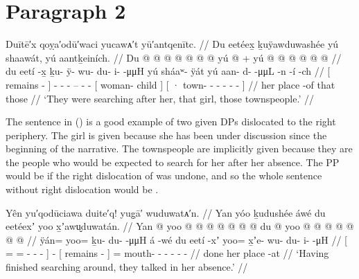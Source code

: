 \section{Paragraph 2}

\ex\label{ex:89-19-searching-for-girl}%
%
\begingl
	\glpreamble	Duītē′x qoỵa′odū′waci yucawᴀ′t yū′antqenītc. //
	\glpreamble	Du eetéex̱ ḵuÿawduwashée yú shaawát, yú aantḵeiních. //
	\gla	{} Du  @ {} {}
		 @ {} @ {} @ {} @ {} @ {} @ {}
		{} yú  @ {} {} +
		{} yú  @ {} @ {} @ {} @ {} @ {} @ {} {} //
	\glb	{} du eetí -x̱ {}
		ḵu- ÿ- wu- du- i-  -μμH
		{} yú sháaʷ- ÿát {}
		{} yú aan- d-  -μμL -n -í -ch {} //
	\glc	{}[  remains - {}]
		- - - -- -  -
		{}[  woman- child {}]
		{}[ · town- -  - - - - {}] //
	\gld	{} her place -of {}
		 {} {} {} {} {} {}
		{} that  {} {}
		{} those  {} {} {} {} {} {} {} //
	\glft	‘They were searching after her, that girl, those townspeople.’
		//
\endgl
\xe

The sentence in (\lastx) is a good example of two given DPs dislocated to the right periphery.
The girl  is given because she has been under discussion since the beginning of the narrative.
The townspeople  are implicitly given because they are the people who would be expected to search for her after her absence.
The PP  would be  if the right dislocation of  was undone, and so the whole sentence without right dislocation would be .

\ex\label{ex:89-20-done-searching-talked}%
%
\begingl
	\glpreamble	Yên yu′qodūciawa duite′q! yug̣ā′ wuduwatᴀ′n. //
	\glpreamble	Yan yóo ḵudushée áwé du eetéexʼ yoo x̱ʼawu̬duwatán. //
	\gla	{} Yan @ yoo @  @ {} @ {} @ {} @ {} @ {} {}
		 @ {}
		{} du  @ {} {}
		yoo @  @ {} @ {} @ {} @ {} @ {} @ {} //
	\glb	{} ÿán= yoo= ḵu- {} du-  -μμH {} {}
		á -wé
		{} du eetí -xʼ {}
		yoo= x̱ʼe- wu- du- {} i-  -μH //
	\glc	{}[ = = - \· -  - \· {}]
		 -
		{}[  remains - {}]
		= mouth- - - - -  - //
	\gld	{} done   {} {} {} {} {} {}
		 {}
		{} her place -at {}
		  {} {} {} {} {} {} //
	\glft	‘Having finished searching around, they talked in her absence.’
		//
\endgl
\xe

